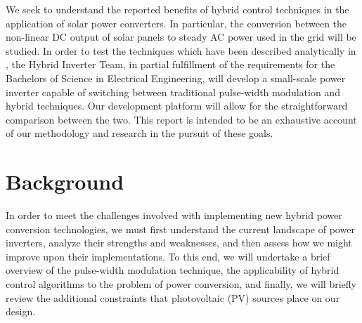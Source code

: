 We seek to understand the reported benefits of hybrid control techniques in the application of solar power converters. In particular, the conversion between the non-linear DC output of solar panels to steady AC power used in the grid will be studied. In order to test the techniques which have been described analytically in \cite{ricardo}, the Hybrid Inverter Team, in partial fulfillment of the requirements for the Bachelors of Science in Electrical Engineering, will develop a small-scale power inverter capable of switching between traditional pulse-width modulation and hybrid techniques. Our development platform will allow for the straightforward comparison between the two. This report is intended to be an exhaustive account of our methodology and research in the pursuit of these goals.

\section{Background}
In order to meet the challenges involved with implementing new hybrid power conversion technologies, we must first understand the current landscape of power inverters, analyze their strengths and weaknesses, and then assess how we might improve upon their implementations. To this end, we will undertake a brief overview of the pulse-width modulation technique, the applicability of hybrid control algorithms to the problem of power conversion, and finally, we will briefly review the additional constraints that photovoltaic (PV) sources place on our design. 

